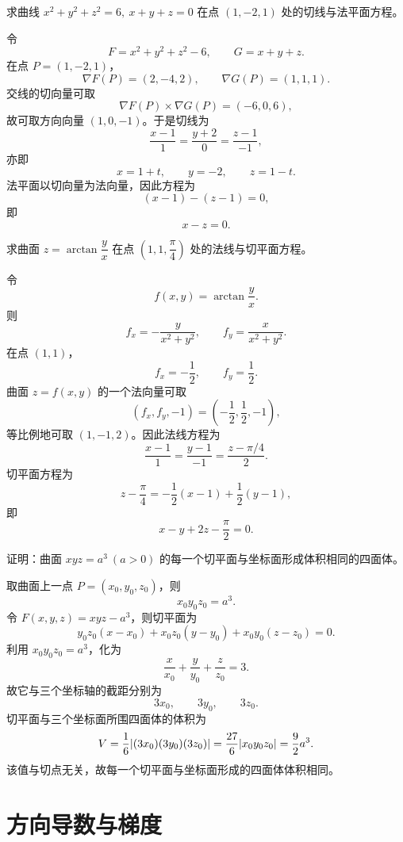 \begin{xexercise}[3]
求曲线 $x^2+y^2+z^2=6,\ x+y+z=0$ 在点 $(1,-2,1)$ 处的切线与法平面方程。
\end{xexercise}
\begin{xsolution}
令
\[
  F=x^2+y^2+z^2-6,
  \qquad
  G=x+y+z.
\]
在点 $P=(1,-2,1)$，
\[
  \nabla F(P)=(2,-4,2),
  \qquad
  \nabla G(P)=(1,1,1).
\]
交线的切向量可取
\[
  \nabla F(P)\times\nabla G(P)=(-6,0,6),
\]
故可取方向向量 $(1,0,-1)$。于是切线为
\[
  \frac{x-1}{1}=\frac{y+2}{0}=\frac{z-1}{-1},
\]
亦即
\[
  x=1+t,\qquad y=-2,\qquad z=1-t.
\]
法平面以切向量为法向量，因此方程为
\[
  (x-1)-(z-1)=0,
\]
即
\[
  x-z=0.
\]
\end{xsolution}


\begin{xexercise}[4]
求曲面 $z=\arctan\dfrac{y}{x}$ 在点 $\left(1,1,\dfrac{\pi}{4}\right)$ 处的法线与切平面方程。
\end{xexercise}
\begin{xsolution}
令
\[
  f(x,y)=\arctan\frac yx.
\]
则
\[
  f_x=-\frac{y}{x^2+y^2},
  \qquad
  f_y=\frac{x}{x^2+y^2}.
\]
在点 $(1,1)$，
\[
  f_x=-\frac12,
  \qquad
  f_y=\frac12.
\]
曲面 $z=f(x,y)$ 的一个法向量可取
\[
  (f_x,f_y,-1)=\left(-\frac12,\frac12,-1\right),
\]
等比例地可取 $(1,-1,2)$。因此法线方程为
\[
  \frac{x-1}{1}=\frac{y-1}{-1}
  =\frac{z-\pi/4}{2}.
\]
切平面方程为
\[
  z-\frac\pi4
  =-\frac12(x-1)+\frac12(y-1),
\]
即
\[
  x-y+2z-\frac\pi2=0.
\]
\end{xsolution}


\begin{xexercise}[5]
证明：曲面 $xyz=a^3\ (a>0)$ 的每一个切平面与坐标面形成体积相同的四面体。
\end{xexercise}
\begin{xsolution}
取曲面上一点 $P=(x_0,y_0,z_0)$，则
\[
  x_0y_0z_0=a^3.
\]
令 $F(x,y,z)=xyz-a^3$，则切平面为
\[
  y_0z_0(x-x_0)+x_0z_0(y-y_0)+x_0y_0(z-z_0)=0.
\]
利用 $x_0y_0z_0=a^3$，化为
\[
  \frac{x}{x_0}+\frac{y}{y_0}+\frac{z}{z_0}=3.
\]
故它与三个坐标轴的截距分别为
\[
  3x_0,\qquad 3y_0,\qquad 3z_0.
\]
切平面与三个坐标面所围四面体的体积为
\[
  V=\frac16\lvert(3x_0)(3y_0)(3z_0)\rvert
  =\frac{27}{6}\lvert x_0y_0z_0\rvert
  =\frac92a^3.
\]
该值与切点无关，故每一个切平面与坐标面形成的四面体体积相同。
\end{xsolution}


\section{方向导数与梯度}

